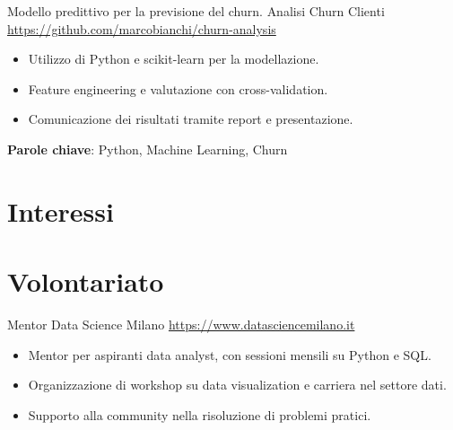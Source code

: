 \documentclass[a4paper, serif, 10pt]{moderncv}
\begin{document}
        {Modello predittivo per la previsione del churn.}
        {Analisi Churn Clienti}
        {\url{https://github.com/marcobianchi/churn-analysis}}
        {}
        {\begin{itemize}
\item Utilizzo di Python e scikit-learn per la modellazione.
\item Feature engineering e valutazione con cross-validation.
\item Comunicazione dei risultati tramite report e presentazione.
\end{itemize}
\textbf{Parole chiave}: Python, Machine Learning, Churn}
\section{Interessi}

\section{Volontariato}

        {Mentor}
        {Data Science Milano}
        {\url{https://www.datasciencemilano.it}}
        {}
        {\begin{itemize}
\item Mentor per aspiranti data analyst, con sessioni mensili su Python e SQL.
\item Organizzazione di workshop su data visualization e carriera nel settore dati.
\item Supporto alla community nella risoluzione di problemi pratici.
\end{itemize}}
    
\end{document}
